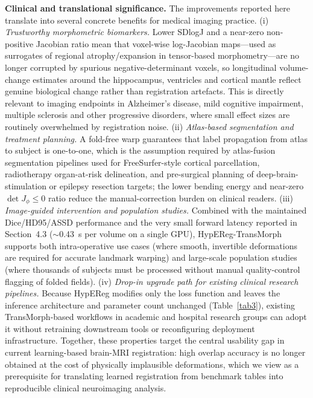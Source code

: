 \documentclass[jimaging,article,submit,pdftex,moreauthors]{Definitions/mdpi}
\begin{document}
\noindent\textbf{Clinical and translational significance.}
The improvements reported here translate into several concrete benefits for medical imaging practice. (i) \emph{Trustworthy morphometric biomarkers.} Lower SDlogJ and a near-zero non-positive Jacobian ratio mean that voxel-wise log-Jacobian maps---used as surrogates of regional atrophy/expansion in tensor-based morphometry---are no longer corrupted by spurious negative-determinant voxels, so longitudinal volume-change estimates around the hippocampus, ventricles and cortical mantle reflect genuine biological change rather than registration artefacts. This is directly relevant to imaging endpoints in Alzheimer's disease, mild cognitive impairment, multiple sclerosis and other progressive disorders, where small effect sizes are routinely overwhelmed by registration noise. (ii) \emph{Atlas-based segmentation and treatment planning.} A fold-free warp guarantees that label propagation from atlas to subject is one-to-one, which is the assumption required by atlas-fusion segmentation pipelines used for FreeSurfer-style cortical parcellation, radiotherapy organ-at-risk delineation, and pre-surgical planning of deep-brain-stimulation or epilepsy resection targets; the lower bending energy and near-zero \(\det J_\phi \le 0\) ratio reduce the manual-correction burden on clinical readers. (iii) \emph{Image-guided intervention and population studies.} Combined with the maintained Dice/HD95/ASSD performance and the very small forward latency reported in Section~4.3 (\(\sim\)0.43~s per volume on a single GPU), HypEReg-TransMorph supports both intra-operative use cases (where smooth, invertible deformations are required for accurate landmark warping) and large-scale population studies (where thousands of subjects must be processed without manual quality-control flagging of folded fields). (iv) \emph{Drop-in upgrade path for existing clinical research pipelines.} Because HypEReg modifies only the loss function and leaves the inference architecture and parameter count unchanged (Table~\ref{tab3}), existing TransMorph-based workflows in academic and hospital research groups can adopt it without retraining downstream tools or reconfiguring deployment infrastructure. Together, these properties target the central usability gap in current learning-based brain-MRI registration: high overlap accuracy is no longer obtained at the cost of physically implausible deformations, which we view as a prerequisite for translating learned registration from benchmark tables into reproducible clinical neuroimaging analysis.
\end{document}
